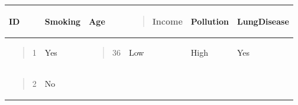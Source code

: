 {\def\LTcaptype{none} %
\begin{longtable}[]{@{}
  >{\raggedright\arraybackslash}p{}
  >{\centering\arraybackslash}p{}
  >{\raggedright\arraybackslash}p{}
  >{\centering\arraybackslash}p{}
  >{\centering\arraybackslash}p{}
  >{\centering\arraybackslash}p{}@{}}
\toprule\noalign{}
\begin{minipage}[b]{\linewidth}\raggedright
ID
\end{minipage} & \begin{minipage}[b]{\linewidth}\centering
Smoking
\end{minipage} & \begin{minipage}[b]{\linewidth}\raggedright
Age
\end{minipage} & \begin{minipage}[b]{\linewidth}\raggedright
\begin{quote}
Income
\end{quote}
\end{minipage} & \begin{minipage}[b]{\linewidth}\raggedright
Pollution
\end{minipage} & \begin{minipage}[b]{\linewidth}\raggedright
LungDisease
\end{minipage} \\
\midrule\noalign{}
\endhead
\bottomrule\noalign{}
\endlastfoot
\begin{minipage}[t]{\linewidth}\raggedright
\begin{quote}
1
\end{quote}
\end{minipage} & Yes & \begin{minipage}[t]{\linewidth}\raggedright
\begin{quote}
36
\end{quote}
\end{minipage} & Low & High & Yes \\
\begin{minipage}[t]{\linewidth}\raggedright
\begin{quote}
2
\end{quote}
\end{minipage} & No & \begin{minipage}[t]{\linewidth}\raggedright

\end{minipage}
\end{longtable}}
